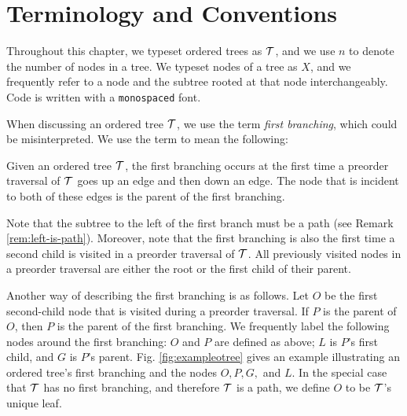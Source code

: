 \section{Terminology and Conventions} \label{sec:termsandcons}

Throughout this chapter, we typeset ordered trees as $\mathcal{T}$, and we use $n$ to denote the number of nodes in a tree.
We typeset nodes of a tree as $X$, and we frequently refer to a node and the subtree rooted at that node interchangeably.
Code is written with a \texttt{monospaced} font.

When discussing an ordered tree $\mathcal{T}$, we use the term \emph{first branching}, which could be misinterpreted. 
We use the term to mean the following: 
\begin{definition}
    Given an ordered tree $\mathcal{T}$, the first branching occurs at the first time a preorder traversal of $\mathcal{T}$ goes up an edge and then down an edge.
The node that is incident to both of these edges is the parent of the first branching.
\end{definition}
Note that the subtree to the left of the first branch must be a path (see Remark \ref{rem:left-is-path}). Moreover, note that the first branching is also the first time a second child is visited in a preorder traversal of $\mathcal{T}$.  All previously visited nodes in a preorder traversal are either the root or the first child of their parent.


Another way of describing the first branching is as follows.
Let $O$ be the first second-child node that is visited during a preorder traversal.
If $P$ is the parent of $O$, then $P$ is the parent of the first branching.
We frequently label the following nodes around the first branching: $O$ and $P$ are defined as above; $L$ is $P$'s first child, and $G$ is $P$'s parent. 
Fig. \ref{fig:exampleotree} gives an example illustrating an ordered tree's first branching and the nodes $O,P,G,$ and $L$. In the special case that $\mathcal{T}$ has no first branching, and therefore $\mathcal{T}$ is a path, we define $O$ to be $\mathcal{T}$'s unique leaf.





